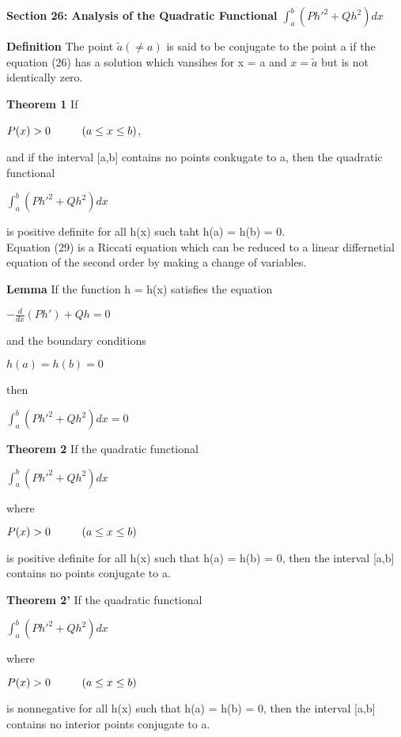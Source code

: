 \documentclass{article}
\newcommand\tab[1][1cm]{\hspace*{#1}}
\begin{document}
\textbf {Section 26: Analysis of the Quadratic Functional $\int_a^b (Ph'^2 + Qh^2) dx$}

\textbf {Definition} The point $\tilde{a} (\neq a)$ is said to be conjugate to the point a if the equation (26) has a solution which vansihes for x = a and $x = \tilde{a}$ but is not identically zero.

\textbf {Theorem 1} If 
\begin{center}
$P(x) > 0 \tab (a \leq x \leq b)$,
\end{center}
and if the interval [a,b] contains no points conkugate to a, then the quadratic functional
\begin{center}
$\int_a^b (Ph'^2 + Qh^2)dx$
\end{center}
is positive definite for all h(x) such taht h(a) = h(b) = 0. \\

 Equation (29) is a Riccati equation which can be reduced to a linear differnetial equation of the second order by making a change of variables.

\textbf {Lemma} If the function h = h(x) satisfies the equation
\begin{center}
$- \frac{d}{dx} (Ph') + Qh = 0$
\end{center}
and the boundary conditions
\begin{center}
$h(a) = h(b) = 0$
\end{center}
then 
\begin{center}
$\int_a^b (Ph'^2 + Qh^2) dx = 0$
\end{center}

\textbf {Theorem 2} If the quadratic functional
\begin{center}
$\int_a^b (Ph'^2 + Qh^2) dx$
\end{center}
where
\begin{center}
$P(x) > 0 \tab (a \leq x \leq b)$
\end{center}
is positive definite for all h(x) such that h(a) = h(b) = 0, then the interval [a,b] contains no points conjugate to a.

\textbf {Theorem 2'} If the quadratic functional
\begin{center}
$\int_a^b (Ph'^2 + Qh^2) dx$
\end{center}
where
\begin{center}
$P(x) > 0 \tab (a \leq x \leq b)$
\end{center}
is nonnegative for all h(x) such that h(a) = h(b) = 0, then the interval [a,b] contains no interior points conjugate to a.
\end{document}
